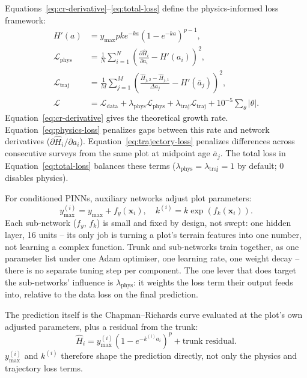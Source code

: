 Equations~\eqref{eq:cr-derivative}--\eqref{eq:total-loss} define the physics-informed loss framework:
\begin{align}
H'(a) &= y_{\max}pk e^{-ka}\left(1-e^{-ka}\right)^{p-1}, \label{eq:cr-derivative} \\
\mathcal{L}_{\mathrm{phys}} &= \frac{1}{N}\sum_{i=1}^{N}\left(\frac{\partial\hat H_i}{\partial a_i}-H'(a_i)\right)^2, \label{eq:physics-loss} \\
\mathcal{L}_{\mathrm{traj}} &= \frac{1}{M}\sum_{j=1}^{M}\left(\frac{\hat H_{j,2}-\hat H_{j,1}}{\Delta a_j}-H'(\bar a_j)\right)^2, \label{eq:trajectory-loss} \\
\mathcal{L} &= \mathcal{L}_{\mathrm{data}} + \lambda_{\mathrm{phys}}\mathcal{L}_{\mathrm{phys}} + \lambda_{\mathrm{traj}}\mathcal{L}_{\mathrm{traj}} + 10^{-5}\sum_{\theta}|\theta|. \label{eq:total-loss}
\end{align}
Equation~\eqref{eq:cr-derivative} gives the theoretical growth rate. Equation~\eqref{eq:physics-loss} penalizes gaps between this rate and network derivatives ($\partial\hat H_i/\partial a_i$). Equation~\eqref{eq:trajectory-loss} penalizes differences across consecutive surveys from the same plot at midpoint age $\bar a_j$. The total loss in Equation~\eqref{eq:total-loss} balances these terms ($\lambda_{\mathrm{phys}}=\lambda_{\mathrm{traj}}=1$ by default; 0 disables physics).

For conditioned PINNs, auxiliary networks adjust plot parameters:
\begin{equation}
y_{\max}^{(i)} = y_{\max}+f_y(\mathbf{x}_i), \quad k^{(i)} = k\exp\!\left(f_k(\mathbf{x}_i)\right).
\label{eq:param-adjust}
\end{equation}
Each sub-network ($f_y$, $f_k$) is small and fixed by design, not swept: one hidden layer, 16 units -- its only job is turning a plot's terrain features into one number, not learning a complex function. Trunk and sub-networks train together, as one parameter list under one Adam optimiser, one learning rate, one weight decay -- there is no separate tuning step per component. The one lever that does target the sub-networks' influence is $\lambda_{\mathrm{phys}}$: it weights the loss term their output feeds into, relative to the data loss on the final prediction.

The prediction itself is the Chapman--Richards curve evaluated at the plot's own adjusted parameters, plus a residual from the trunk:
\begin{equation}
\hat H_i = y_{\max}^{(i)}\left(1-e^{-k^{(i)}a_i}\right)^{p} + \text{trunk residual}.
\label{eq:pinn-prediction}
\end{equation}
$y_{\max}^{(i)}$ and $k^{(i)}$ therefore shape the prediction directly, not only the physics and trajectory loss terms.

